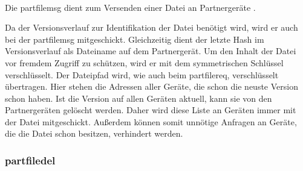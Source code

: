 	\begin{rightwordgroup}{\isprotomsgdata}
		 \\
		\skippedwords \\
		 \\
		 \\
		\skippedwords \\
		 \\
		 \\
		\skippedwords \\
		 \\
		 \\
		\skippedwords \\
	\end{rightwordgroup}
Die \gls{partfilemsg} dient zum Versenden einer Datei an Partnergeräte  .
\begin{description}
	Da der Versionsverlauf zur Identifikation der Datei benötigt wird, wird er auch bei der \gls{partfilemsg} mitgeschickt. Gleichzeitig dient der letzte Hash im Versionsverlauf als Dateiname auf dem Partnergerät.
	Um den Inhalt der Datei vor fremdem Zugriff zu schützen, wird er mit dem symmetrischen Schlüssel  verschlüsselt. 
	Der Dateipfad wird, wie auch beim \gls{partfilereq}, verschlüsselt übertragen. 
	Hier stehen die Adressen aller Geräte, die schon die neuste Version schon haben. Ist die Version auf allen Geräten aktuell, kann sie von den Partnergeräten gelöscht werden. Daher wird diese Liste an Geräten immer mit der Datei mitgeschickt. Außerdem können somit unnötige Anfragen an Geräte, die die Datei schon besitzen, verhindert werden.
\end{description}

\subsubsection{\gls{partfiledel}}
\messagestart
	\begin{rightwordgroup}{\isprotomsgtype}
	\end{rightwordgroup} \\
	
